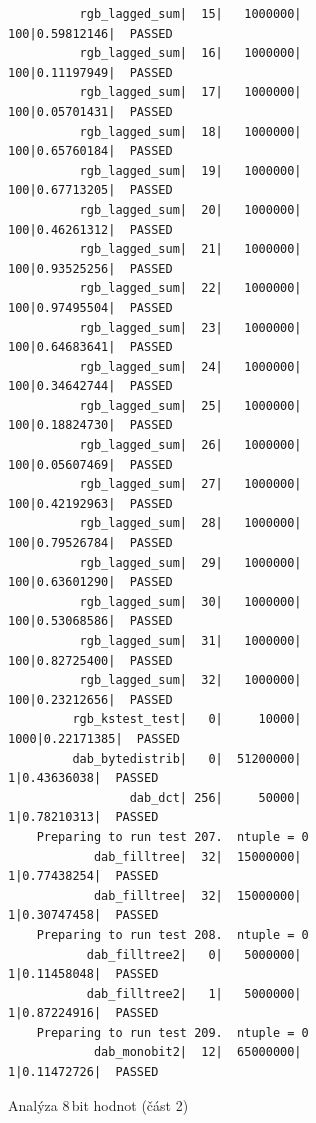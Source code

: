 \documentclass[11pt, a4paper, titlepage]{article}
\begin{document}
\begin{figure}[H]
\begin{verbatim}
          rgb_lagged_sum|  15|   1000000|     100|0.59812146|  PASSED
          rgb_lagged_sum|  16|   1000000|     100|0.11197949|  PASSED
          rgb_lagged_sum|  17|   1000000|     100|0.05701431|  PASSED
          rgb_lagged_sum|  18|   1000000|     100|0.65760184|  PASSED
          rgb_lagged_sum|  19|   1000000|     100|0.67713205|  PASSED
          rgb_lagged_sum|  20|   1000000|     100|0.46261312|  PASSED
          rgb_lagged_sum|  21|   1000000|     100|0.93525256|  PASSED
          rgb_lagged_sum|  22|   1000000|     100|0.97495504|  PASSED
          rgb_lagged_sum|  23|   1000000|     100|0.64683641|  PASSED
          rgb_lagged_sum|  24|   1000000|     100|0.34642744|  PASSED
          rgb_lagged_sum|  25|   1000000|     100|0.18824730|  PASSED
          rgb_lagged_sum|  26|   1000000|     100|0.05607469|  PASSED
          rgb_lagged_sum|  27|   1000000|     100|0.42192963|  PASSED
          rgb_lagged_sum|  28|   1000000|     100|0.79526784|  PASSED
          rgb_lagged_sum|  29|   1000000|     100|0.63601290|  PASSED
          rgb_lagged_sum|  30|   1000000|     100|0.53068586|  PASSED
          rgb_lagged_sum|  31|   1000000|     100|0.82725400|  PASSED
          rgb_lagged_sum|  32|   1000000|     100|0.23212656|  PASSED
         rgb_kstest_test|   0|     10000|    1000|0.22171385|  PASSED
         dab_bytedistrib|   0|  51200000|       1|0.43636038|  PASSED
                 dab_dct| 256|     50000|       1|0.78210313|  PASSED
    Preparing to run test 207.  ntuple = 0
            dab_filltree|  32|  15000000|       1|0.77438254|  PASSED
            dab_filltree|  32|  15000000|       1|0.30747458|  PASSED
    Preparing to run test 208.  ntuple = 0
           dab_filltree2|   0|   5000000|       1|0.11458048|  PASSED
           dab_filltree2|   1|   5000000|       1|0.87224916|  PASSED
    Preparing to run test 209.  ntuple = 0
            dab_monobit2|  12|  65000000|       1|0.11472726|  PASSED
    \end{verbatim}
    \caption{Analýza 8\,bit hodnot (část 2)}
    \label{tab:analysis_8b_2}
\end{figure}


\renewcommand{\refname}{Zdroje}
\end{document}

